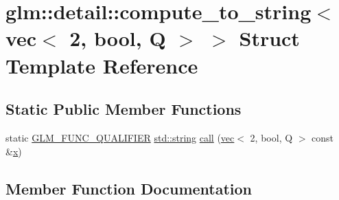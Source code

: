 \hypertarget{structglm_1_1detail_1_1compute__to__string_3_01vec_3_012_00_01bool_00_01_q_01_4_01_4}{}\section{glm\+:\+:detail\+:\+:compute\+\_\+to\+\_\+string$<$ vec$<$ 2, bool, Q $>$ $>$ Struct Template Reference}
\label{structglm_1_1detail_1_1compute__to__string_3_01vec_3_012_00_01bool_00_01_q_01_4_01_4}
\subsection*{Static Public Member Functions}
\begin{DoxyCompactItemize}
\item 
static \mbox{\hyperlink{setup_8hpp_a33fdea6f91c5f834105f7415e2a64407}{G\+L\+M\+\_\+\+F\+U\+N\+C\+\_\+\+Q\+U\+A\+L\+I\+F\+I\+ER}} \mbox{\hyperlink{_s_d_l__opengl__glext_8h_ae84541b4f3d8e1ea24ec0f466a8c568b}{std\+::string}} \mbox{\hyperlink{structglm_1_1detail_1_1compute__to__string_3_01vec_3_012_00_01bool_00_01_q_01_4_01_4_a08b55aa0b86bc8176b9fa02f0520c434}{call}} (\mbox{\hyperlink{structglm_1_1vec}{vec}}$<$ 2, bool, Q $>$ const \&\mbox{\hyperlink{_s_d_l__opengl_8h_ad0e63d0edcdbd3d79554076bf309fd47}{x}})
\end{DoxyCompactItemize}


\subsection{Member Function Documentation}
\mbox{\label{structglm_1_1detail_1_1compute__to__string_3_01vec_3_012_00_01bool_00_01_q_01_4_01_4_a08b55aa0b86bc8176b9fa02f0520c434}} 
